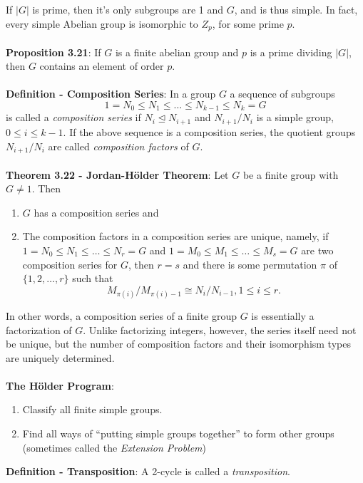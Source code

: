 \documentclass{article}
\begin{document}
If $|G|$ is prime, then it's only subgroups are 1 and $G$, and is thus simple. In fact, every simple Abelian group is isomorphic to $Z_p$, for some prime $p$. \\ \\
\textbf{Proposition 3.21}: If $G$ is a finite abelian group and $p$ is a prime dividing $|G|$, then $G$ contains an element of order $p$. \\ \\
\textbf{Definition - Composition Series}: In a group $G$ a sequence of subgroups $$1 = N_0 \leq N_1 \leq \dots \leq N_{k - 1} \leq N_k = G$$ is called a \textit{composition series} if $N_i \trianglelefteq N_{i + 1}$ and $N_{i + 1}/N_i$ is a simple group, $0 \leq i \leq k - 1$. If the above sequence is a composition series, the quotient groups $N_{i + 1}/N_i$ are called \textit{composition factors} of $G$. \\ \\
\textbf{Theorem 3.22 - Jordan-Hölder Theorem}: Let $G$ be a finite group with $G \neq 1$. Then \begin{enumerate}
    \item $G$ has a composition series and
    \item The composition factors in a composition series are unique, namely, if $1 = N_0 \leq N_1 \leq \dots \leq N_r = G$ and $1 = M_0 \leq M_1 \leq \dots \leq M_s = G$ are two composition series for $G$, then $r = s$ and there is some permutation $\pi$ of $\{1, 2, \dots, r\}$ such that $$M_{\pi(i)}/M_{\pi(i) - 1} \cong N_i/N_{i - 1}, 1 \leq i \leq r.$$
\end{enumerate} $ $ \\
In other words, a composition series of a finite group $G$ is essentially a factorization of $G$. Unlike factorizing integers, however, the series itself need not be unique, but the number of composition factors and their isomorphism types are uniquely determined. \\ \\
\textbf{The Hölder Program}: \begin{enumerate}
    \item Classify all finite simple groups.
    \item Find all ways of ``putting simple groups together'' to form other groups (sometimes called the \textit{Extension Problem})
\end{enumerate} $ $ \\
\textbf{Definition - Transposition}: A 2-cycle is called a \textit{transposition}. \\ \\
\end{document}
